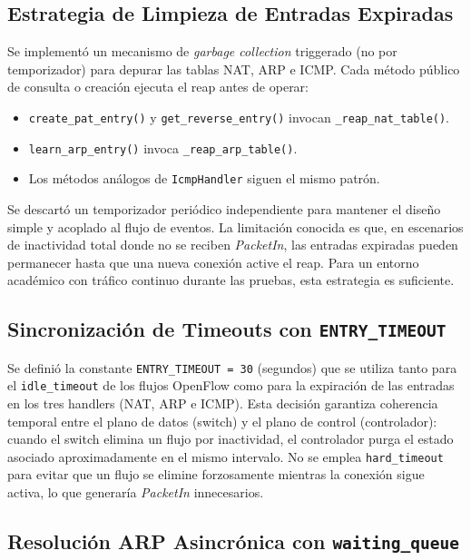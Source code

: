 \documentclass[11pt, a4paper]{article}
\begin{document}
\subsection{Estrategia de Limpieza de Entradas Expiradas}
\label{subsec:reap}

Se implementó un mecanismo de \textit{garbage collection} triggerado (no por temporizador) para depurar las tablas NAT, ARP e ICMP. Cada método público de consulta o creación ejecuta el reap antes de operar:

\begin{itemize}
    \item \texttt{create\_pat\_entry()} y \texttt{get\_reverse\_entry()} invocan \texttt{\_reap\_nat\_table()}.
    \item \texttt{learn\_arp\_entry()} invoca \texttt{\_reap\_arp\_table()}.
    \item Los métodos análogos de \texttt{IcmpHandler} siguen el mismo patrón.
\end{itemize}

Se descartó un temporizador periódico independiente para mantener el diseño simple y acoplado al flujo de eventos. La limitación conocida es que, en escenarios de inactividad total donde no se reciben \textit{PacketIn}, las entradas expiradas pueden permanecer hasta que una nueva conexión active el reap. Para un entorno académico con tráfico continuo durante las pruebas, esta estrategia es suficiente.

\subsection{Sincronización de Timeouts con \texttt{ENTRY\_TIMEOUT}}
\label{subsec:entry_timeout}

Se definió la constante \texttt{ENTRY\_TIMEOUT = 30} (segundos) que se utiliza tanto para el \texttt{idle\_timeout} de los flujos OpenFlow como para la expiración de las entradas en los tres handlers (NAT, ARP e ICMP). Esta decisión garantiza coherencia temporal entre el plano de datos (switch) y el plano de control (controlador): cuando el switch elimina un flujo por inactividad, el controlador purga el estado asociado aproximadamente en el mismo intervalo. No se emplea \texttt{hard\_timeout} para evitar que un flujo se elimine forzosamente mientras la conexión sigue activa, lo que generaría \textit{PacketIn} innecesarios.

\subsection{Resolución ARP Asincrónica con \texttt{waiting\_queue}}
\label{subsec:arp_async}
\end{document}
